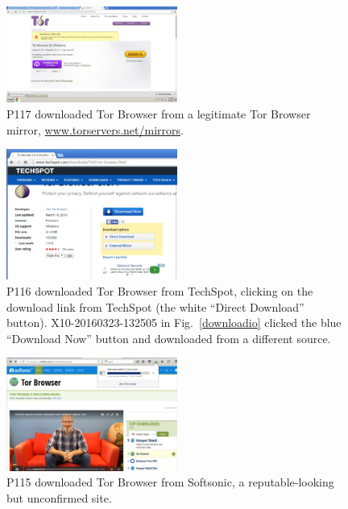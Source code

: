 \documentclass[USenglish,oneside,twocolumn]{article}
\begin{document}
\begin{figure}[h]
\includegraphics[width=0.5\textwidth]{../experiment/processing/bad-participants/X32-20160328-134531-mirror.png}
\caption{P117 downloaded Tor Browser from a legitimate Tor Browser mirror, \url{www.torservers.net/mirrors}.}
\label{mirror}
\end{figure}

\begin{figure}[h]
\includegraphics[width=0.5\textwidth]{../experiment/processing/bad-participants/20160323-133257-techspot.png}
\caption{P116 downloaded Tor Browser from TechSpot, clicking on the download link from 
TechSpot (the white ``Direct Download'' button). X10-20160323-132505 in Fig.~\ref{downloadio} clicked the blue ``Download Now'' button and downloaded from a different source.}
\label{techspot}
\end{figure}

\begin{figure}[h]
\includegraphics[width=0.5\textwidth]{../experiment/processing/bad-participants/20160330-161511-softsonic.png}
\caption{P115 downloaded Tor Browser from Softsonic, a reputable-looking but
unconfirmed site.}
\label{softsonic}
\end{figure}
\end{document}
